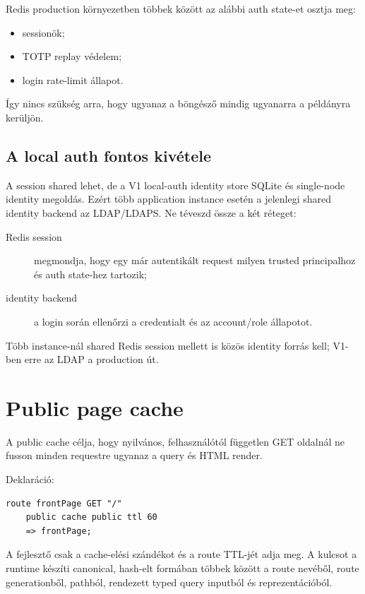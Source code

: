 Redis production környezetben többek között az alábbi auth state-et osztja meg:

\begin{itemize}
  \item sessionök;
  \item TOTP replay védelem;
  \item login rate-limit állapot.
\end{itemize}

Így nincs szükség arra, hogy ugyanaz a böngésző mindig ugyanarra a példányra kerüljön.

\subsection*{A local auth fontos kivétele}

A session shared lehet, de a V1 local-auth identity store SQLite és single-node identity megoldás. Ezért több application instance esetén a jelenlegi shared identity backend az LDAP/LDAPS. Ne téveszd össze a két réteget:

\begin{description}
  \item[Redis session] megmondja, hogy egy már autentikált request milyen trusted principalhoz és auth state-hez tartozik;
  \item[identity backend] a login során ellenőrzi a credentialt és az account/role állapotot.
\end{description}

Több instance-nál shared Redis session mellett is közös identity forrás kell; V1-ben erre az LDAP a production út.

\section{Public page cache}

A public cache célja, hogy nyilvános, felhasználótól független GET oldalnál ne fusson minden requestre ugyanaz a query és HTML render.

Deklaráció:

\begin{lstlisting}[language=RWLang]
route frontPage GET "/"
    public cache public ttl 60
    => frontPage;
\end{lstlisting}

A fejlesztő csak a cache-elési szándékot és a route TTL-jét adja meg. A kulcsot a runtime készíti canonical, hash-elt formában többek között a route nevéből, route generationből, pathból, rendezett typed query inputból és reprezentációból.

